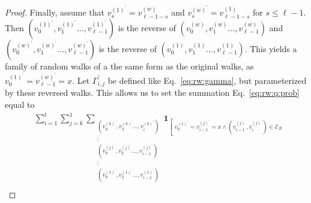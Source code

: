 \documentclass{report}
\begin{document}
\begin{proof}
Finally, assume that $v^{(1)^\prime}_s = v^{(w)}_{\ell -1 - s}$ and $v^{(w)^\prime}_s = v^{(1)}_{\ell -1 - s}$ for $s \leq \ell-1$.
Then $\left ( v_0^{(1)^\prime}, v_1^{(1)^\prime} \dots, v_{\ell-1}^{(1)^\prime} \right )$ is the reverse of $\left ( v_0^{(w)}, v_{1}^{(w)} \dots, v_{\ell-1}^{(w)} \right )$ and $\left ( v_0^{(w)^\prime}, v_1^{(w)^\prime} \dots, v_{\ell-1}^{(w)^\prime} \right )$ is the reverse of $\left ( v_0^{(1)}, v_{1}^{(1)} \dots, v_{\ell-1}^{(1)} \right )$.
This yields a family of random walks of a the same form as the original walks, as $v_0^{(1)^\prime} = v_{\ell - 1}^{(w)^\prime} = x$.
Let $\Gamma_{i,j}^\prime$ be defined like Eq.~\ref{eq:rw:gamma}, but parameterized by these reversed walks.
This allows us to set the summation Eq.~\eqref{eq:rw:q:prob} equal to 
%
\begin{align}
\label{eq:rw:q:prob:reverse}
& 
\sum_{i = 1}^{t} 
\sum_{j =k}^{1} 
\sum_{\substack{
	\left (v_0^{(k)^\prime}, v_2^{(k)^\prime} \dots, v_i^{(k)^\prime} \right ) \\
	\vdots \\
	\left (v_0^{(j)^\prime}, v_2^{(j)^\prime} \dots, v_{i-1}^{(j)^\prime} \right ) \\
	\vdots \\
	\left (v_0^{(1)^\prime}, v_2^{(1)^\prime} \dots, v_{i-1}^{(1)^\prime} \right ) \\
}}
\mathbf{1}_{ \left [\substack{
	v_0^{(1)^\prime} = v_{i-1}^{(j)^\prime} = x 
			\wedge \left ( v_{i-1}^{(j)^\prime}, v_{i}^{(j)^\prime} \right ) \in \mathcal{E}_\mathcal{B} 
}}
\end{align}
\end{proof}
\end{document}
